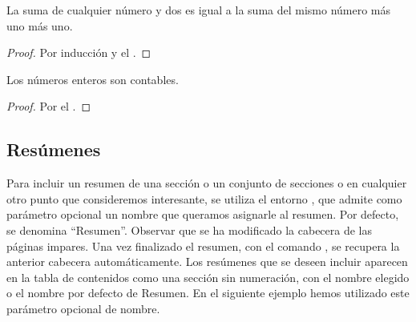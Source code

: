 \begin{teor}[Suma]
 La suma de cualquier número y dos es igual a la suma del mismo número más uno más uno.
\end{teor}
\begin{proof}
Por inducción y el .
\end{proof}

\begin{coro}[Contables]
  Los números enteros son contables.
\end{coro}
\begin{proof}
Por el .
\end{proof}


\subsection{Resúmenes}%
Para incluir un resumen de una sección o un conjunto de secciones o en cualquier otro punto que consideremos interesante, se utiliza el entorno , que admite como parámetro opcional un nombre que queramos asignarle al resumen. Por defecto, se denomina ``Resumen''. Observar que se ha modificado la cabecera de las páginas impares. Una vez finalizado el resumen, con el comando , se recupera la anterior cabecera automáticamente. Los resúmenes que se deseen incluir aparecen en la tabla de contenidos como una sección sin numeración, con el nombre elegido o el nombre por defecto de Resumen. En el siguiente ejemplo hemos utilizado este parámetro opcional de nombre.


